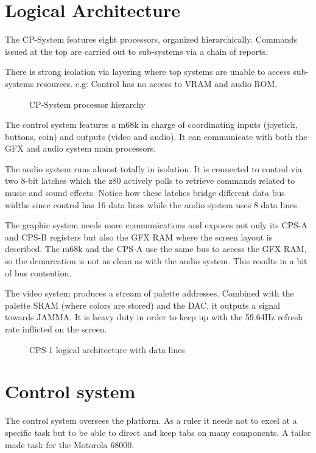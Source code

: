 \section{Logical Architecture}
The CP-System features eight processors, organized hierarchically. Commands issued at the top are carried out to sub-systems via a chain of reports. 

There is strong isolation via layering where top systems are unable to access sub-systems resources. e.g: Control has no access to VRAM and audio ROM.

\begin{figure}[H]
  \caption*{CP-System processor hierarchy}
  \end{figure}


The control system features a m68k in charge of coordinating inputs (joystick, buttons, coin) and outputs (video and audio). It can communicate with both the GFX and audio system main processors.

The audio system runs almost totally in isolation. It is connected to control via two 8-bit latches which the z80 actively polls to retrieve commands related to music and sound effects. Notice how these latches bridge different data bus widths since control has 16 data lines while the audio system uses 8 data lines.

The graphic system needs more communications and exposes not only its CPS-A and CPS-B registers but also the GFX RAM where the screen layout is described. The m68k and the CPS-A use the same bus to access the GFX RAM, so the demarcation is not as clean as with the audio system. This results in a bit of bus contention.  

The video system produces a stream of palette addresses. Combined with the palette SRAM (where colors are stored) and the DAC, it outputs a signal towards JAMMA. It is heavy duty in order to keep up with the 59.64Hz refresh rate inflicted on the screen.

\begin{figure}[H]
  \caption*{CPS-1 logical architecture with data lines}
  \label{cps1_arch}
  \end{figure}


\section{Control system}
The control system oversees the platform. As a ruler it needs not to excel at a specific task but to be able to direct and keep tabs on many components. A tailor made task for the Motorola 68000.


